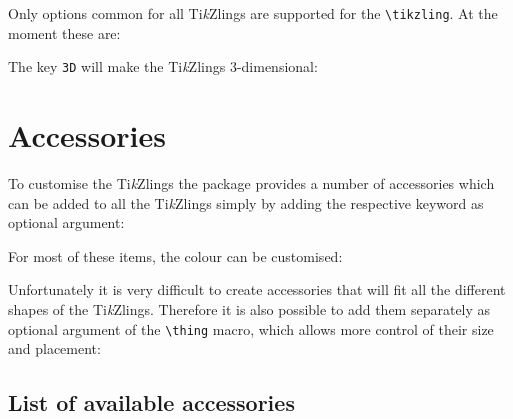 \documentclass[parskip=half]{scrartcl}
\newcommand{\tikzlings}{Ti\emph{k}Zlings\xspace}
\begin{document}
Only options common for all \tikzlings are supported for the \lstinline|\tikzling|. At the moment these are: 

\begin{tcblisting}{}
\tikzling[body=SteelBlue]
\end{tcblisting}

The key \lstinline|3D| will make the Ti\emph{k}Zlings 3-dimensional:

\begin{tcblisting}{}
\tikzling[3D]
\end{tcblisting}

\clearpage
\section{Accessories}

To customise the \tikzlings the package provides a number of accessories which can be added to all the \tikzlings simply by adding the respective keyword as optional argument:

\begin{tcblisting}{}
\bear[hat]
\end{tcblisting}
 
For most of these items, the colour can be customised:

\begin{tcblisting}{}
\koala[crown=orange!50!yellow]
\end{tcblisting}

Unfortunately it is very difficult to create accessories that will fit all the different shapes of the \tikzlings. Therefore it is also possible to add them separately as optional argument of the \lstinline|\thing| macro, which allows more control of their size and placement:

\begin{tcblisting}{}
\owl
\thing[tophat,scale=1.5,yshift=-0.6cm,xshift=-0.05cm]
\end{tcblisting}

\subsection{List of available accessories}

\begin{tcblisting}{}
\tikzling[tophat]
\end{tcblisting}

\begin{tcblisting}{}
\tikzling[hat]
\end{tcblisting}

\begin{tcblisting}{}
\tikzling[alien]
\end{tcblisting}

\begin{tcblisting}{}
\tikzling[crown]
\end{tcblisting}

\begin{tcblisting}{}
\tikzling[crystalball]
\end{tcblisting}
\end{document}
